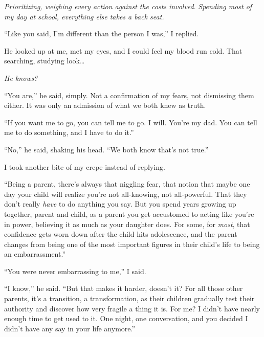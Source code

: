 \emph{Prioritizing, weighing every action against the costs involved}.  \emph{Spending most of my day at school, everything else takes a back seat.}



``Like you said, I'm different than the person I was,'' I replied.



He looked up at me, met my eyes, and I could feel my blood run cold.  That searching, studying look\ldots



\emph{He knows?}



``You are,'' he said, simply.  Not a confirmation of my fears, not dismissing them either.  It was only an admission of what we both knew as truth.



``If you want me to go, you can tell me to go.  I will.  You're my dad.  You can tell me to do something, and I have to do it.''



``No,'' he said, shaking his head.  ``We both know that's not true.''



I took another bite of my crepe instead of replying.



``Being a parent, there's always that niggling fear, that notion that maybe one day your child will realize you're not all-knowing, not all-powerful.  That they don't really \emph{have} to do anything you say.  But you spend years growing up together, parent and child, as a parent you get accustomed to acting like you're in power, believing it as much as your daughter does.  For some, for \emph{most}, that confidence gets worn down after the child hits adolescence, and the parent changes from being one of the most important figures in their child's life to being an embarrassment.''



``You were never embarrassing to me,'' I said.



``I know,'' he said.  ``But that makes it harder, doesn't it?  For all those other parents, it's a transition, a transformation, as their children gradually test their authority and discover how very fragile a thing it is.  For me?  I didn't have nearly enough time to get used to it.  One night, one conversation, and you decided I didn't have any say in your life anymore.''



